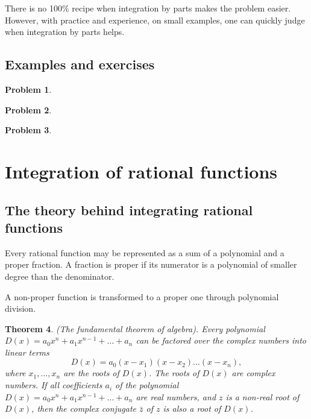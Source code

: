 \documentclass[12pt]{book}
\newtheorem{theorem}{Theorem}[section]
\newtheorem{problem}[theorem]{Problem}
\begin{document}
There is no 100\% recipe when integration by parts makes the problem easier. However, with practice and experience, on small examples, one can quickly judge when integration by parts helps.
\subsection{Examples and exercises}

\begin{problem}

\end{problem}


\begin{problem}

\end{problem}

\begin{problem}

\end{problem}

\section{Integration of rational functions} \label{secIntegrationRationalFunctions}


\subsection{The theory behind integrating rational functions}
Every rational function may be represented as a sum of a polynomial and a proper fraction. A fraction is proper if its numerator is a polynomial of smaller degree than the denominator.

A non-proper function is transformed to a proper one through polynomial
division.

\begin{theorem}(The fundamental theorem of algebra). Every polynomial $D(x)= a_0x^n+a_{1}x^{n-1}+\dots + a_n$ can be factored over the complex numbers into linear terms
\begin{equation}\label{eqFundamentaTheoremAlgebra}
D(x)=a_0(x-x_1)(x-x_2)\dots (x-x_n),
\end{equation}
where $x_1,\dots, x_n$ are the roots of $D(x)$. The roots of $D(x)$ are complex numbers.
If all coefficients $a_i$ of the polynomial $D(x)= a_0x^n+a_{1}x^{n-1}+\dots + a_n$ are real numbers, and $z$ is a non-real root of $D(x)$, then the complex conjugate $\bar z$ of $z$ is also a root of $D(x)$.
\end{theorem}
\end{document}
